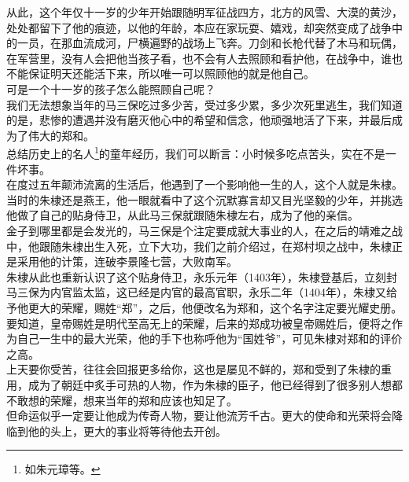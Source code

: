 \begin{multicols}{\theparacolNo}
从此，这个年仅十一岁的少年开始跟随明军征战四方，北方的风雪、大漠的黄沙，处处都留下了他的痕迹，以他的年龄，本应在家玩耍、嬉戏，却突然变成了战争中的一员，在那血流成河，尸横遍野的战场上飞奔。刀剑和长枪代替了木马和玩偶，在军营里，没有人会把他当孩子看，也不会有人去照顾和看护他，在战争中，谁也不能保证明天还能活下来，所以唯一可以照顾他的就是他自己。\\

可是一个十一岁的孩子怎么能照顾自己呢？\\

我们无法想象当年的马三保吃过多少苦，受过多少累，多少次死里逃生，我们知道的是，悲惨的遭遇并没有磨灭他心中的希望和信念，他顽强地活了下来，并最后成为了伟大的郑和。\\

总结历史上的名人\footnote{如朱元璋等。}的童年经历，我们可以断言：小时候多吃点苦头，实在不是一件坏事。\\

在度过五年颠沛流离的生活后，他遇到了一个影响他一生的人，这个人就是朱棣。\\

当时的朱棣还是燕王，他一眼就看中了这个沉默寡言却又目光坚毅的少年，并挑选他做了自己的贴身侍卫，从此马三保就跟随朱棣左右，成为了他的亲信。\\

金子到哪里都是会发光的，马三保是个注定要成就大事业的人，在之后的靖难之战中，他跟随朱棣出生入死，立下大功，我们之前介绍过，在郑村坝之战中，朱棣正是采用他的计策，连破李景隆七营，大败南军。\\

朱棣从此也重新认识了这个贴身侍卫，永乐元年（1403年），朱棣登基后，立刻封马三保为内官监太监，这已经是内官的最高官职，永乐二年（1404年），朱棣又给予他更大的荣耀，赐姓“郑”，之后，他便改名为郑和，这个名字注定要光耀史册。\\

要知道，皇帝赐姓是明代至高无上的荣耀，后来的郑成功被皇帝赐姓后，便将之作为自己一生中的最大光荣，他的手下也称呼他为“国姓爷”，可见朱棣对郑和的评价之高。\\

上天要你受苦，往往会回报更多给你，这也是屡见不鲜的，郑和受到了朱棣的重用，成为了朝廷中炙手可热的人物，作为朱棣的臣子，他已经得到了很多别人想都不敢想的荣耀，想来当年的郑和应该也知足了。\\

但命运似乎一定要让他成为传奇人物，要让他流芳千古。更大的使命和光荣将会降临到他的头上，更大的事业将等待他去开创。\\


\end{multicols}
